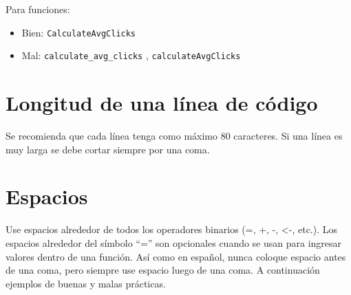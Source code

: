 \documentclass[10pt,]{krantz}
\makeatletter
\newenvironment{Shaded}{\begin{snugshade}}{\end{snugshade}}
\newcommand{\KeywordTok}[1]{\textcolor[rgb]{0.13,0.29,0.53}{\textbf{{#1}}}}
\newcommand{\DecValTok}[1]{\textcolor[rgb]{0.00,0.00,0.81}{{#1}}}
\newcommand{\StringTok}[1]{\textcolor[rgb]{0.31,0.60,0.02}{{#1}}}
\newcommand{\CommentTok}[1]{\textcolor[rgb]{0.56,0.35,0.01}{\textit{{#1}}}}
\newcommand{\NormalTok}[1]{{#1}}
\newenvironment{kframe}{%
\medskip{}
\setlength{\fboxsep}{.8em}
 \def\at@end@of@kframe{}%
 \ifinner\ifhmode%
  \def\at@end@of@kframe{\end{minipage}}%
  \begin{minipage}{\columnwidth}%
 \fi\fi%
 \def\FrameCommand##1{\hskip\@totalleftmargin \hskip-\fboxsep
 \colorbox{shadecolor}{##1}\hskip-\fboxsep
     \hskip-\linewidth \hskip-\@totalleftmargin \hskip\columnwidth}%
 \MakeFramed {\advance\hsize-\width
   \@totalleftmargin\z@ \linewidth\hsize
   \@setminipage}}%
 {\par\unskip\endMakeFramed%
 \at@end@of@kframe}
\renewenvironment{Shaded}{\begin{kframe}}{\end{kframe}}
\makeatother
\begin{document}
Para funciones:

\begin{itemize}
    \item Bien: \verb|CalculateAvgClicks| 
    \item Mal: \verb|calculate_avg_clicks| , \verb|calculateAvgClicks|
\end{itemize}

\section{Longitud de una línea de
código}\label{longitud-de-una-linea-de-codigo}

Se recomienda que cada línea tenga como máximo 80 caracteres. Si una
línea es muy larga se debe cortar siempre por una coma.

\section{Espacios}\label{espacios}

Use espacios alrededor de todos los operadores binarios (=, +, -,
\textless{}-, etc.). Los espacios alrededor del símbolo ``='' son
opcionales cuando se usan para ingresar valores dentro de una función.
Así como en español, nunca coloque espacio antes de una coma, pero
siempre use espacio luego de una coma. A continuación ejemplos de buenas
y malas prácticas.

\begin{Shaded}
\end{Shaded}
\end{document}
